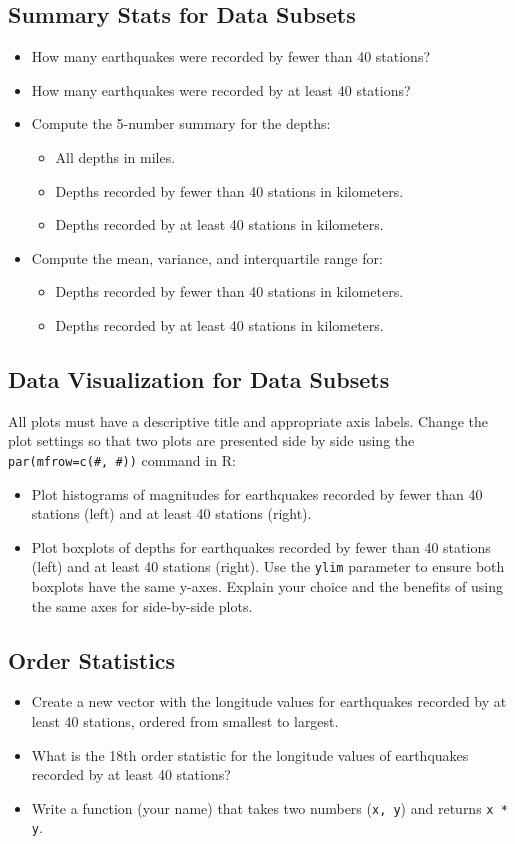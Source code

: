 \documentclass{article}
\begin{document}
\subsection*{Summary Stats for Data Subsets}
\begin{itemize}
    \item How many earthquakes were recorded by fewer than 40 stations?
    \item How many earthquakes were recorded by at least 40 stations?
    \item Compute the 5-number summary for the depths:
    \begin{itemize}
        \item All depths in miles.
        \item Depths recorded by fewer than 40 stations in kilometers.
        \item Depths recorded by at least 40 stations in kilometers.
    \end{itemize}
    \item Compute the mean, variance, and interquartile range for:
    \begin{itemize}
        \item Depths recorded by fewer than 40 stations in kilometers.
        \item Depths recorded by at least 40 stations in kilometers.
    \end{itemize}
\end{itemize}

\subsection*{Data Visualization for Data Subsets}
All plots must have a descriptive title and appropriate axis labels. Change the plot settings so that two plots are presented side by side using the \texttt{par(mfrow=c(\#, \#))} command in R:
\begin{itemize}
    \item Plot histograms of magnitudes for earthquakes recorded by fewer than 40 stations (left) and at least 40 stations (right).
    \item Plot boxplots of depths for earthquakes recorded by fewer than 40 stations (left) and at least 40 stations (right). Use the \texttt{ylim} parameter to ensure both boxplots have the same y-axes. Explain your choice and the benefits of using the same axes for side-by-side plots.
\end{itemize}

\subsection*{Order Statistics}
\begin{itemize}
    \item Create a new vector with the longitude values for earthquakes recorded by at least 40 stations, ordered from smallest to largest.
    \item What is the 18th order statistic for the longitude values of earthquakes recorded by at least 40 stations?
    \item Write a function (your name) that takes two numbers (\texttt{x, y}) and returns \texttt{x * y}.
\end{itemize}
\end{document}
